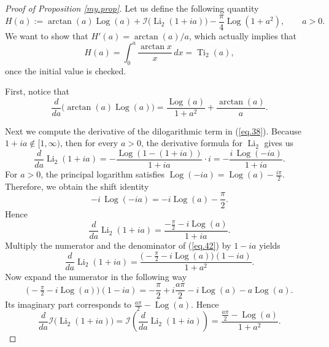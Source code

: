 \documentclass[preprint,12pt,nopreprintline]{elsarticle}
\begin{document}
\begin{proof}[Proof of Proposition \ref{my.prop}]\normalfont
Let us define the following quantity
\begin{equation}\label{eq.38}
H(a):=\arctan(a)\operatorname{Log}(a)
+
\mathscr{I}\!\bigl(\operatorname{Li}_2(1+ia)\bigr)
-\frac{\pi}{4}\operatorname{Log}(1+a^2),
\qquad a>0.
\end{equation}
We want to show that \(H'(a)=\arctan(a)/a\), which actually implies that
\begin{equation}
H(a)=\int_0^a \frac{\arctan x}{x}\,dx=\operatorname{Ti}_2(a),
\end{equation}
once the initial value is checked.

First, notice that
\begin{equation}\label{eq.40}
\frac{d}{da}\bigl(\arctan(a)\operatorname{Log}(a)\bigr)
=
\frac{\operatorname{Log}(a)}{1+a^2}+\frac{\arctan(a)}{a}.
\end{equation}

Next we compute the derivative of the dilogarithmic term in (\ref{eq.38}). Because \(1+ia\notin [1,\infty)\), then
for every \(a>0\), the derivative formula for \(\operatorname{Li}_2\) gives us
\begin{equation}
\frac{d}{da}\operatorname{Li}_2(1+ia)
=
-\frac{\operatorname{Log}(1-(1+ia))}{1+ia}\cdot i
=
-\frac{i\,\operatorname{Log}(-ia)}{1+ia}.
\end{equation}
For \(a>0\), the principal logarithm satisfies \(\operatorname{Log}(-ia)=\operatorname{Log}(a)-\frac{i\pi}{2}\). Therefore, we obtain the shift identity
\begin{equation}
-i\,\operatorname{Log}(-ia)
=
-i\operatorname{Log}(a)-\frac{\pi}{2}.
\end{equation}
Hence
\begin{equation}\label{eq.42}
\frac{d}{da}\operatorname{Li}_2(1+ia)
=
\frac{-\frac{\pi}{2}-i\operatorname{Log}(a)}{1+ia}.
\end{equation}
Multiply the numerator and the denominator of (\ref{eq.42}) by \(1-ia\) yields
\begin{equation}
\frac{d}{da}\operatorname{Li}_2(1+ia)
=
\frac{\bigl(-\frac{\pi}{2}-i\operatorname{Log}(a)\bigr)(1-ia)}{1+a^2}.
\end{equation}
Now expand the numerator in the following way
\begin{equation}\label{eq.44}
\bigl(-\tfrac{\pi}{2}-i\operatorname{Log}(a)\bigr)(1-ia)
=
-\frac{\pi}{2}
+
i\frac{a\pi}{2}
-
i\operatorname{Log}(a)
-
a\operatorname{Log}(a).
\end{equation}
Its imaginary part corresponds to \(\frac{a\pi}{2}-\operatorname{Log}(a)\).
Hence
\begin{equation}\label{eq.46}
\frac{d}{da}\mathscr{I}\!\bigl(\operatorname{Li}_2(1+ia)\bigr)
=
\mathscr{I}\!\left(\frac{d}{da}\operatorname{Li}_2(1+ia)\right)
=
\frac{\frac{a\pi}{2}-\operatorname{Log}(a)}{1+a^2}.
\end{equation}


\end{proof}
\end{document}
